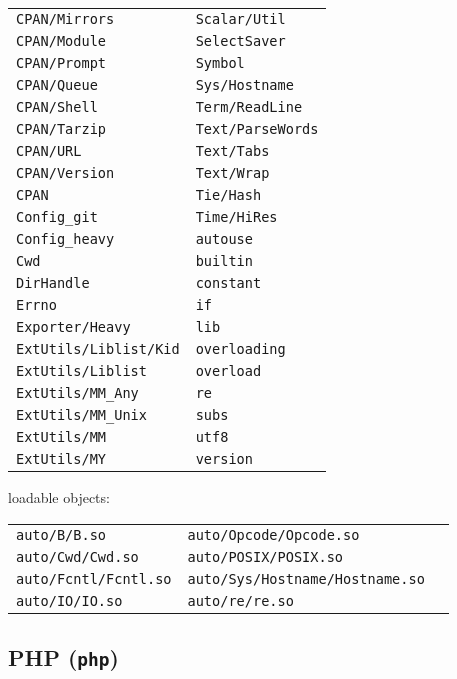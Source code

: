 {\begin{longtable}{l l}
\texttt{CPAN/Mirrors} & \texttt{Scalar/Util} \\
\texttt{CPAN/Module} & \texttt{SelectSaver} \\
\texttt{CPAN/Prompt} & \texttt{Symbol} \\
\texttt{CPAN/Queue} & \texttt{Sys/Hostname} \\
\texttt{CPAN/Shell} & \texttt{Term/ReadLine} \\
\texttt{CPAN/Tarzip} & \texttt{Text/ParseWords} \\
\texttt{CPAN/URL} & \texttt{Text/Tabs} \\
\texttt{CPAN/Version} & \texttt{Text/Wrap} \\
\texttt{CPAN} & \texttt{Tie/Hash} \\
\texttt{Config\_git} & \texttt{Time/HiRes} \\
\texttt{Config\_heavy} & \texttt{autouse} \\
\texttt{Cwd} & \texttt{builtin} \\
\texttt{DirHandle} & \texttt{constant} \\
\texttt{Errno} & \texttt{if} \\
\texttt{Exporter/Heavy} & \texttt{lib} \\
\texttt{ExtUtils/Liblist/Kid} & \texttt{overloading} \\
\texttt{ExtUtils/Liblist} & \texttt{overload} \\
\texttt{ExtUtils/MM\_Any} & \texttt{re} \\
\texttt{ExtUtils/MM\_Unix} & \texttt{subs} \\
\texttt{ExtUtils/MM} & \texttt{utf8} \\
\texttt{ExtUtils/MY} & \texttt{version} \\
\end{longtable}
loadable objects:
\setlength{\tabcolsep}{15pt}
\begin{longtable}{l l l}
\texttt{auto/B/B.so} & \texttt{auto/Opcode/Opcode.so} \\
\texttt{auto/Cwd/Cwd.so} & \texttt{auto/POSIX/POSIX.so} \\
\texttt{auto/Fcntl/Fcntl.so} & \texttt{auto/Sys/Hostname/Hostname.so} \\
\texttt{auto/IO/IO.so} & \texttt{auto/re/re.so} \\
\end{longtable}
}

\subsection{PHP (\texttt{php})}

